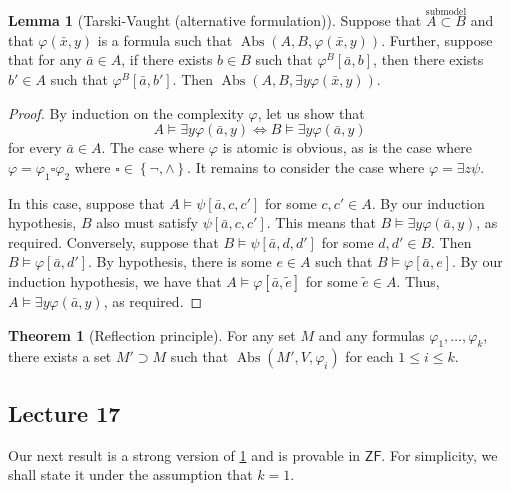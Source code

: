 \documentclass[10pt,letterpaper,cm]{nupset}
\theoremstyle{definition}
\theoremstyle{theorem}
\newtheorem{theorem}[definition]{Theorem}
\newtheorem{lemma}[definition]{Lemma}
\theoremstyle{remark}
\newcommand{\1}{\mathbf{1}}
\newcommand{\0}{\vec 0}
\newcommand{\zf}{\mathsf{ZF}}
\DeclareMathOperator{\abs}{Abs}
\begin{document}
\begin{lemma}[Tarski-Vaught (alternative formulation)]
Suppose that $\overset{\text{submodel}}{A \subset B}$ and that $\varphi(\bar{x}, y)$ is a formula such that $\abs(A, B, \varphi(\bar{x}, y))$. Further, suppose that for any $\bar{a} \in A$, if there exists $b\in B$ such that $\varphi^B\left[\bar{a}, b\right]$, then there exists $b' \in A$ such that $\varphi^B\left[\bar{a}, b'\right]$. Then $\abs(A, B, \exists{y}\varphi(\bar{x}, y))$.
\end{lemma}
\begin{proof}
By induction on the complexity $\varphi$, let us show that $$A\models \exists{y}\varphi(\bar{a}, y) \iff B\models \exists{y}\varphi(\bar{a}, y) $$ for every $\bar{a}\in A$.  The case where $\varphi$ is atomic is obvious, as is the case where $\varphi   = \varphi_1 \square \varphi_2$ where $\square \in \left\{\neg, \land\right\}$. It remains to consider the case where $\varphi = \exists{z}\psi$. 

\smallskip

In this case, suppose that $A \models \psi\left[\bar{a},c, c'\right]$ for some $c,c'\in A$. By our induction hypothesis, $B$ also must satisfy  $\psi\left[\bar{a},c, c'\right]$. This means that $B\models \exists{y}\varphi(\bar{a},y)$, as required.
Conversely, suppose that $B\models \psi\left[\bar{a}, d, d'\right]$ for some $d,d'\in B$. Then $B\models \varphi\left[\bar{a}, d'\right]$. By hypothesis, there is some $e\in A$ such that $B \models \varphi\left[\bar{a}, e\right]$. By our induction hypothesis, we have that $A \models \varphi\left[\bar{a}, \tilde{e}\right]$ for some $\tilde{e}\in A$. Thus, $A\models \exists{y}\varphi(\bar{a},y)$, as required.

\end{proof}

\begin{theorem}[Reflection principle]\label{RP}
For any set $M$ and any formulas $\varphi_1, \ldots, \varphi_k$, there exists a set $M' \supset M$ such that $\abs(M', V, \varphi_i)$ for each $1\leq i \leq k$.
\end{theorem}

\subsection{Lecture 17}

Our next result is a strong version of \cref{RP} and is provable in $\zf$. For simplicity, we shall state it under the assumption that $k=1$.
\end{document}
